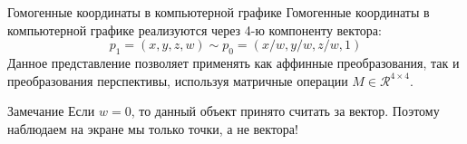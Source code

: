 \documentclass{beamer}
\begin{document}
\begin{frame}{Гомогенные координаты в компьютерной графике}
Гомогенные координаты в компьютерной графике реализуются через 4-ю компоненту вектора:
\begin{equation*}
    p_1 = (x, y, z, w) \sim p_0 = (x/w, y/w, z/w, 1)
\end{equation*}
Данное представление позволяет применять как аффинные преобразования, так и преобразования перспективы, используя матричные операции $M \in \mathcal{R}^{4 \times 4}$.
\begin{block}{Замечание}
    Если $w = 0$, то данный объект принято считать за вектор. Поэтому наблюдаем на экране мы только точки, а не вектора!
\end{block}
\end{frame}
\end{document}
